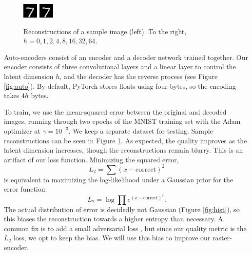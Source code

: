 \documentclass[11pt]{article}
\begin{document}
\begin{figure}
  \includegraphics[width=0.2\columnwidth]{diagrams/reconstructions/32.png}
  \includegraphics[width=0.2\columnwidth]{diagrams/reconstructions/64.png}
  \caption{Reconstructions of a sample image (left). To the right, $h=0, 1, 2, 4, 8, 16, 32, 64$.}
  \label{fig:recon}
\end{figure}

Auto-encoders consist of an encoder and a decoder network trained together. Our encoder consists of three convolutional layers and a linear layer to control the latent dimension $h$, and the decoder has the reverse process (see Figure \ref{fig:auto}). By default, PyTorch stores floats using four bytes, so the encoding takes $4h$ bytes.

To train, we use the mean-squared error between the original and decoded images, running through two epochs of the MNIST training set with the Adam optimizer at $\gamma=10^{-3}$. We keep a separate dataset for testing. Sample reconstructions can be seen in Figure \ref{fig:recon}. As expected, the quality improves as the latent dimension increases, though the reconstructions remain blurry. This is an artifact of our loss function. Minimizing the squared error,
$$L_2 = \sum (x-\mathrm{correct})^2$$
is equivalent to maximizing the log-likelihood under a Gaussian prior for the error function:
$$L_2 = \log\prod e^{(x-\mathrm{correct})^2}.$$
The actual distribution of error is decidedly not Gaussian (Figure \ref{fig:hist}), so this biases the reconstruction towards a higher entropy than necessary. A common fix is to add a small adversarial loss \citep{makhzani-2016-adversarial}, but since our quality metric is the $L_2$ loss, we opt to keep the bias. We will use this bias to improve our raster-encoder.
\end{document}
